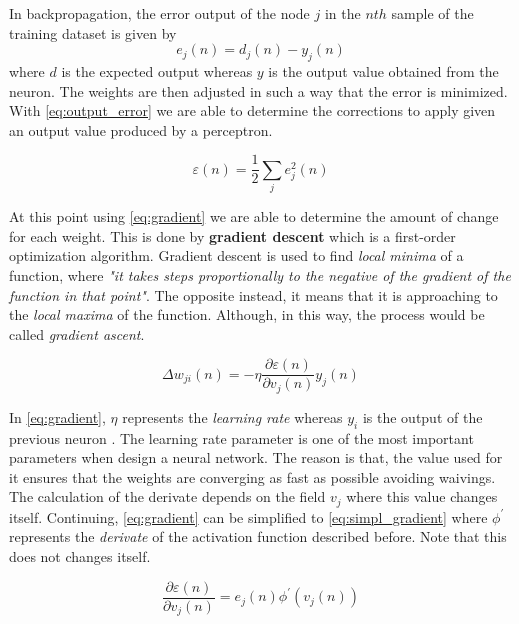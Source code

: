 \noindent In backpropagation, the error output of the node $j$ in the $nth$ sample of the training dataset is given by
\begin{equation}
    e_{j}(n) = d_{j}(n) - y_{j}(n)
\end{equation}
where $d$ is the expected output whereas $y$ is the output value obtained from the neuron. The weights are then adjusted in such a way that the error is minimized. With \ref{eq:output_error} we are able to determine the corrections to apply given an output value produced by a perceptron.

\begin{equation}\label{eq:output_error}
    \varepsilon (n) = \frac{1}{2}\sum_{j} e^2_{j}(n)
\end{equation}

\noindent At this point using \ref{eq:gradient} we are able to determine the amount of change for each weight. This is done by \textbf{gradient descent} which is a first-order optimization algorithm. Gradient descent is used to find \textit{local minima} of a function, where \textit{"it takes steps proportionally to the negative of the gradient of the function in that point"}\cite{gradient_wiki}. The opposite instead, it means that it is approaching to the \textit{local maxima} of the function. Although, in this way, the process would be called \textit{gradient ascent}\cite{gradient_wiki}.

\begin{equation}\label{eq:gradient}
    \Delta w_{ji}(n) = -\eta \frac{\partial \varepsilon (n)}{\partial v_{j} (n)}y_{j}(n)
\end{equation}

\noindent In \ref{eq:gradient}, $\eta$ represents the \textit{learning rate} whereas $y_{i}$ is the output of the previous neuron \cite{mlp_wiki}. The learning rate parameter is one of the most important parameters when design a neural network. The reason is that, the value used for it ensures that the weights are converging as fast as possible avoiding waivings. \\

\noindent The calculation of the derivate depends on the field $v_{j}$ where this value changes itself. Continuing, \ref{eq:gradient} can be simplified to \ref{eq:simpl_gradient} where $\phi^{\prime}$ represents the \textit{derivate} of the activation function described before. Note that this does not changes itself.

\begin{equation}\label{eq:simpl_gradient}
    \frac{\partial \varepsilon (n)}{\partial v_{j} (n)} = e_{j}(n)\phi^{\prime}(v_{j}(n))
\end{equation}

